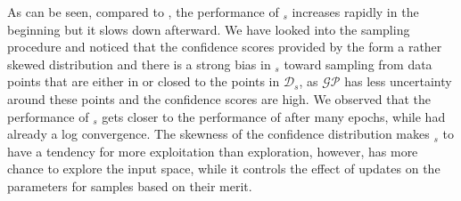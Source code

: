 As can be seen, compared to \fwl, the performance of \fwlnospace$_s$ increases rapidly in the beginning but it slows down afterward. 
We have looked into the sampling procedure and noticed that the confidence scores provided by the \tch form a rather skewed distribution and there is a strong bias in \fwlnospace$_s$ toward sampling from data points that are either in or closed to the points in $\mathcal{D}_{s}$, as $\mathcal{GP}$ has less uncertainty around these points and the confidence scores are high.
We observed that the performance of \fwlnospace$_s$ gets closer to the performance of \fwl after many epochs, while \fwl had already a log convergence.
%
The skewness of the confidence distribution makes \fwlnospace$_s$ to have a tendency for more exploitation than exploration, however, \fwl has more chance to explore the input space, while it controls the effect of updates on the parameters for samples based on their merit. 



